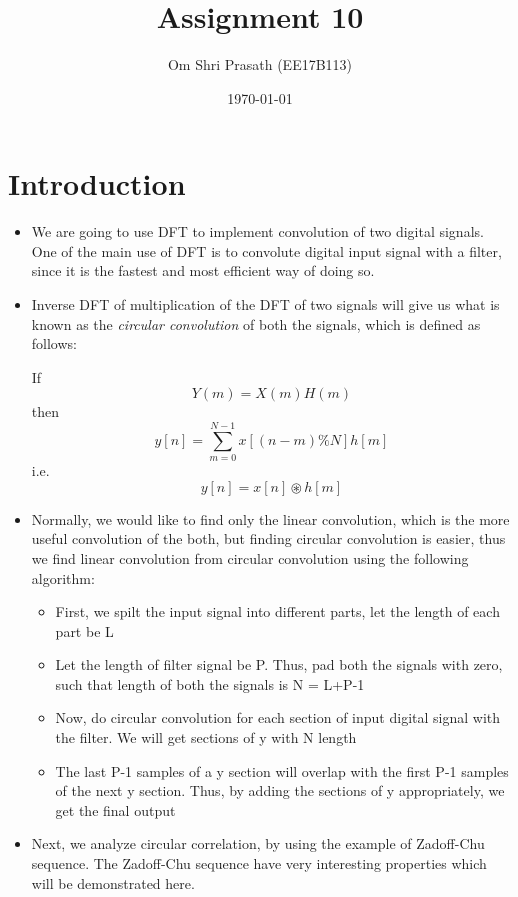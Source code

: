 \documentclass[11pt, a4paper]{article}
\title{Assignment 10} %
\author{Om Shri Prasath (EE17B113)} %
\date{\today} %
\begin{document}
	

\maketitle %
\section{Introduction}\label{introduction}

\begin{itemize}
  \item We are going to use DFT to implement convolution of two digital signals. One of the main use of DFT is to convolute digital input signal with a filter, since it is the fastest and most efficient way of doing so.
  \item Inverse DFT of multiplication of the DFT of two signals will give us what is known as the \textsl{circular convolution} of both the signals, which is defined as follows:
  \begin{center} If
  \begin{equation}
    Y(m) = X(m)H(m)
  \end{equation}
  then
  \begin{equation}
    y[n] = \sum_{m=0}^{N-1}x[(n-m)\%N]h[m]
  \end{equation}
  i.e.
  \begin{equation}
    y[n] = x[n]\circledast h[m]
  \end{equation}
\end{center}
  \item Normally, we would like to find only the linear convolution, which is the more useful convolution of the both, but finding circular convolution is easier, thus we find linear convolution from circular convolution using the following algorithm:
  \begin{itemize}
    \item First, we spilt the input signal into different parts, let the length of each part be L
    \item Let the length of filter signal be P. Thus, pad both the signals with zero, such that length of both the signals is N = L+P-1
    \item Now, do circular convolution for each section of input digital signal with the filter. We will get sections of y with N length
    \item The last P-1 samples of a y section will overlap with the first P-1 samples of the next y section. Thus, by adding the sections of y appropriately, we get the final output
  \end{itemize}
  \item Next, we analyze circular correlation, by using the example of Zadoff-Chu sequence. The Zadoff-Chu sequence have very interesting properties which will be demonstrated here.
\end{itemize}
\end{document}
